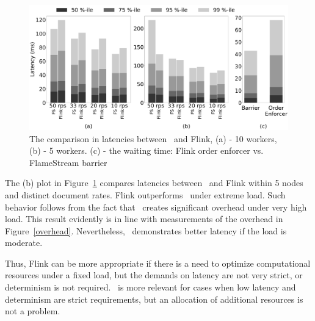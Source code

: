 \begin{figure}[ht]
  \centering
  \includegraphics[width=\textwidth]{pics/comp-index-quantiles}
  \caption{The comparison in latencies between \FlameStream\ and Flink, (a) - 10 workers, (b) - 5 workers. (c) - the waiting time: Flink order enforcer vs. FlameStream barrier}
  \label {fs-index-quantiles}
\end{figure}

The (b) plot in Figure~\ref{fs-index-quantiles} compares  latencies between \FlameStream\ and Flink within 5 nodes and distinct document rates. Flink outperforms \FlameStream\ under extreme load. Such behavior follows from the fact that \FlameStream\ creates significant overhead under very high load. This result evidently is in line with measurements of the overhead in Figure~\ref{overhead}. Nevertheless, \FlameStream\ demonstrates better latency if the load is moderate.

Thus, Flink can be more appropriate if there is a need to optimize computational resources under a fixed load, but the demands on latency are not very strict, or determinism is not required. \FlameStream\ is more relevant for cases when low latency and determinism are strict requirements, but an allocation of additional resources is not a problem.  
